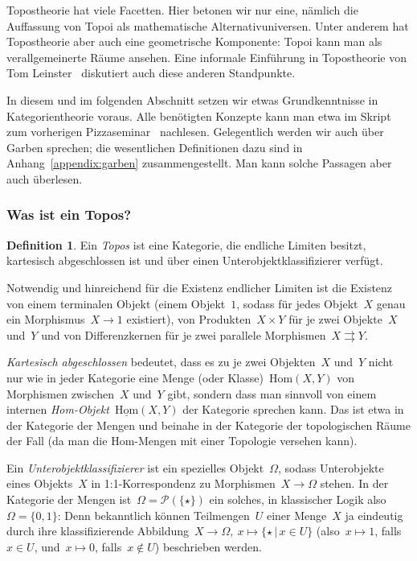 \documentclass[a4paper,ngerman,12pt]{scrartcl}
\theoremstyle{definition}
\newtheorem{defn}{Definition}[section]
\theoremstyle{plain}
\theoremstyle{remark}
\renewcommand{\P}{\mathcal{P}}
\newcommand{\Hom}{\mathrm{Hom}}
\renewcommand{\_}{\mathpunct{.}\,}
\newcommand{\?}{\,{:}\,}
\begin{document}
\label{sect:topoi}%
Topostheorie hat viele Facetten. Hier betonen wir nur eine, nämlich
die Auffassung von Topoi als mathematische Alternativuniversen. Unter anderem
hat Topostheorie aber auch eine geometrische Komponente: Topoi kann man als
verallgemeinerte Räume ansehen. Eine informale Einführung in Topostheorie
von Tom Leinster~\cite{leinster:topos} diskutiert auch diese anderen
Standpunkte.

In diesem und im folgenden Abschnitt setzen wir etwas Grundkenntnisse in
Kategorientheorie voraus. Alle benötigten Konzepte kann man etwa im
Skript zum vorherigen Pizzaseminar~\cite{pizzaseminar:kategorientheorie}
nachlesen. Gelegentlich werden wir auch über Garben sprechen; die wesentlichen
Definitionen dazu sind in Anhang~\ref{appendix:garben} zusammengestellt. Man
kann solche Passagen aber auch überlesen.


\subsubsection*{Was ist ein Topos?}

\begin{defn}Ein \emph{Topos} ist eine Kategorie, die endliche Limiten besitzt,
kartesisch abgeschlossen ist und über einen Unterobjektklassifizierer verfügt.
\end{defn}

Notwendig und hinreichend für die Existenz endlicher Limiten ist die Existenz
von einem terminalen Objekt (einem Objekt~$1$, sodass für jedes Objekt~$X$ genau
ein Morphismus~$X \to 1$ existiert), von Produkten~$X \times Y$ für je zwei
Objekte~$X$ und~$Y$ und von Differenzkernen für je zwei parallele Morphismen~$X
\rightrightarrows Y$.

\emph{Kartesisch abgeschlossen} bedeutet, dass es zu je zwei Objekten~$X$
und~$Y$ nicht nur wie in jeder Kategorie eine Menge (oder Klasse)~$\Hom(X,Y)$
von Morphismen zwischen~$X$ und~$Y$ gibt, sondern dass man sinnvoll von einem
internen \emph{Hom-Objekt}~$\underline{\Hom}(X,Y)$ der Kategorie sprechen kann.
Das ist etwa in der Kategorie der Mengen und beinahe in der Kategorie der
topologischen Räume der Fall (da man die Hom-Mengen mit einer Topologie
versehen kann).

Ein \emph{Unterobjektklassifizierer} ist ein spezielles Objekt~$\Omega$, sodass
Unterobjekte eines Objekts~$X$ in 1:1-Korrespondenz zu Morphismen~$X \to
\Omega$ stehen. In der Kategorie der Mengen ist~$\Omega = \P(\{\star\})$ ein solches, in
klassischer Logik also~$\Omega = \{ 0, 1 \}$: Denn bekanntlich
können Teilmengen~$U$ einer Menge~$X$ ja eindeutig durch ihre klassifizierende
Abbildung~$X \to \Omega,\ x \mapsto \{ \star \,|\, x \in U \}$ (also~$x \mapsto
1$, falls~$x \in U$, und~$x \mapsto 0$, falls~$x \not\in U$) beschrieben
werden.
\end{document}
